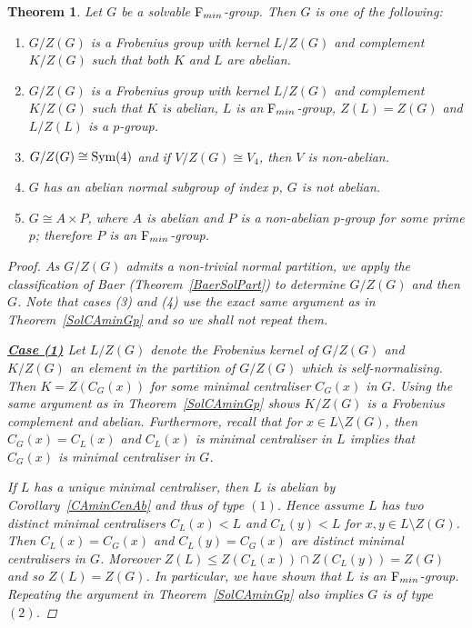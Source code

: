 \documentclass[a4paper,11pt]{article}
\theoremstyle{plain}
\newtheorem{thm}{Theorem}[section]
\numberwithin{thm}{section}
\begin{document}
\begin{thm}
Let $G$ be a solvable ${\rm F}_{min}$-group.
Then $G$ is one of the following:
\begin{enumerate}
\item $G/Z(G)$ is a Frobenius group with kernel $L/Z(G)$ and complement $K/Z(G)$ such that both $K$ and $L$ are abelian.
\item $G/Z(G)$ is a Frobenius group with kernel $L/Z(G)$ and complement $K/Z(G)$ such that $K$ is abelian, $L$ is an ${\rm F}_{min}$-group, $Z(L)=Z(G)$ and $L/Z(L)$ is a $p$-group.
\item $G/Z(G)\cong {\rm Sym}(4)$ and if $V/Z(G)\cong V_4$, then $V$ is non-abelian. 
\item $G$ has an abelian normal subgroup of index $p$, $G$ is not abelian.
\item $G\cong A\times P$, where $A$ is abelian and $P$ is a non-abelian $p$-group for some prime $p$; therefore $P$ is an ${\rm F}_{min}$-group.
\end{enumerate}

\begin{proof}
As $G/Z(G)$ admits a non-trivial normal partition, we apply the classification of Baer (Theorem~\ref{BaerSolPart}) to determine $G/Z(G)$ and then $G$.
Note that cases (3) and (4) use the exact same argument as in Theorem~\ref{SolCAminGp} and so we shall not repeat them.

\underline{\bf Case (1)}\newline
Let $L/Z(G)$ denote the Frobenius kernel of $G/Z(G)$ and $K/Z(G)$ an element in the partition of $G/Z(G)$ which is self-normalising.
Then $K=Z(C_G(x))$ for some minimal centraliser $C_G(x)$ in $G$.
Using the same argument as in Theorem~\ref{SolCAminGp} shows $K/Z(G)$ is a Frobenius complement and abelian.
Furthermore, recall that for $x\in L\setminus Z(G)$, then $C_G(x)=C_L(x)$ and $C_L(x)$ is minimal centraliser in $L$ implies that $C_G(x)$ is minimal centraliser in $G$.

If $L$ has a unique minimal centraliser, then $L$ is abelian by Corollary~\ref{CAminCenAb} and thus of type $(1)$.
Hence assume $L$ has two distinct minimal centralisers $C_L(x)<L$ and $C_L(y)<L$ for $x,y\in L\setminus Z(G)$.
Then $C_L(x)=C_G(x)$ and $C_L(y)=C_G(x)$ are distinct minimal centralisers in $G$.
Moreover $Z(L)\leq Z(C_L(x))\cap Z(C_L(y))=Z(G)$ and so $Z(L)=Z(G)$.
In particular, we have shown that $L$ is an ${\rm F}_{min}$-group.
Repeating the argument in Theorem~\ref{SolCAminGp} also implies $G$ is of type $(2)$.



\end{proof}
\end{thm}
\end{document}
